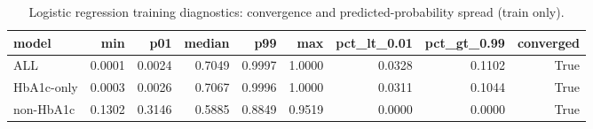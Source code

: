 \begin{table}[H]
\begin{center}
\begin{tabular}{lrrrrrrrr}
\toprule
model & min & p01 & median & p99 & max & pct_lt_0.01 & pct_gt_0.99 & converged \\
\midrule
ALL & 0.0001 & 0.0024 & 0.7049 & 0.9997 & 1.0000 & 0.0328 & 0.1102 & True \\
HbA1c-only & 0.0003 & 0.0026 & 0.7067 & 0.9996 & 1.0000 & 0.0311 & 0.1044 & True \\
non-HbA1c & 0.1302 & 0.3146 & 0.5885 & 0.8849 & 0.9519 & 0.0000 & 0.0000 & True \\
\bottomrule
\end{tabular}
\end{center}
\vspace{-5pt}
\caption{Logistic regression training diagnostics: convergence and predicted-probability spread (train only).}
\label{tab:logit_train_diagnostics}
\end{table}
